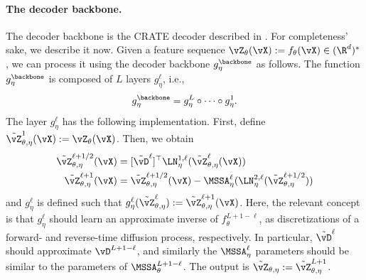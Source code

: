 \documentclass[../../book-main.tex]{subfiles}
\begin{document}
\paragraph{The decoder backbone.} The decoder backbone is the CRATE decoder described in . For completeness' sake, we describe it now. Given a feature sequence \(\vZ_{\theta}(\vX) := f_{\theta}(\vX) \in (\R^{d})^{*}\), we can process it using the decoder backbone \(g_{\eta}^{\backbone}\) as follows. The function \(g_{\eta}^{\backbone}\) is composed of \(L\) layers \(g_{\eta}^{\ell}\), i.e.,
\begin{equation}
    g_{\eta}^{\backbone} = g_{\eta}^{L} \circ \cdots \circ g_{\eta}^{1}.
\end{equation}
The layer \(g_{\eta}^{\ell}\) has the following implementation. First, define \(\tilde{\vZ}_{\theta, \eta}^{1}(\vX) := \vZ_{\theta}(\vX)\). Then, we obtain
\begin{align}
    \tilde{\vZ}_{\theta, \eta}^{\ell + 1/2}(\vX) 
    &= [\tilde{\vD}^{\ell}]^{\top}\LN_{\eta}^{1, \ell}(\tilde{\vZ}_{\theta, \eta}^{\ell}(\vX)) \\ 
    \tilde{\vZ}_{\theta, \eta}^{\ell + 1}(\vX)
    &= \tilde{\vZ}_{\theta, \eta}^{\ell + 1/2}(\vX) - \MSSA_{\eta}^{\ell}(\LN_{\eta}^{2, \ell}(\tilde{\vZ}_{\theta, \eta}^{\ell + 1/2}))
\end{align}
and \(g_{\eta}^{\ell}\) is defined such that \(g_{\eta}^{\ell}(\tilde{\vZ}_{\theta, \eta}^{\ell}) := \tilde{\vZ}_{\theta, \eta}^{\ell + 1}(\vX)\). Here, the relevant concept is that \(g_{\eta}^{\ell}\) should learn an approximate inverse of \(f_{\theta}^{L + 1 - \ell}\), as discretizations of a forward- and reverse-time diffusion process, respectively. In particular, \(\tilde{\vD}^{\ell}\) should approximate \(\vD^{L + 1 - \ell}\), and similarly the \(\MSSA_{\eta}^{\ell}\) parameters should be similar to the parameters of \(\MSSA_{\theta}^{L + 1 - \ell}\). The output is \(\tilde{\vZ}_{\theta, \eta} := \tilde{\vZ}_{\theta, \eta}^{L + 1}\).
\end{document}

